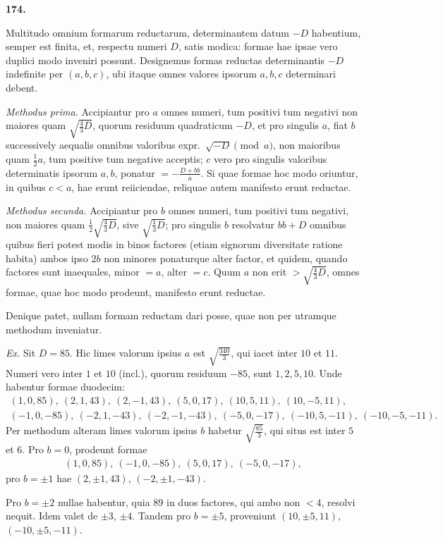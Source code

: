 \documentclass[12pt,a4paper]{article}
\theoremstyle{plain}
\theoremstyle{definition}
\theoremstyle{remark}
\begin{document}
\textbf{174.}

Multitudo omnium formarum reductarum, determinantem datum $-D$ habentium, semper est finita, et, respectu numeri $D$, satis modica: formae hae ipsae vero duplici modo inveniri possunt. Designemus formas reductas determinantis $-D$ indefinite per $(a,b,c)$, ubi itaque omnes valores ipsorum $a,b,c$ determinari debent.

\textit{Methodus prima.} Accipiantur pro $a$ omnes numeri, tum positivi tum negativi non maiores quam $\sqrt{\frac{4}{3}D}$, quorum residuum quadraticum $-D$, et pro singulis $a$, fiat $b$ successively aequalis omnibus valoribus expr.\ $\sqrt{-D}\pmod{a}$, non maioribus quam $\frac{1}{2}a$, tum positive tum negative acceptis; $c$ vero pro singulis valoribus determinatis ipsorum $a,b$, ponatur $=-\frac{D+bb}{a}$. Si quae formae hoc modo oriuntur, in quibus $c<a$, hae erunt reiiciendae, reliquae autem manifesto erunt reductae.

\textit{Methodus secunda.} Accipiantur pro $b$ omnes numeri, tum positivi tum negativi, non maiores quam $\frac{1}{2}\sqrt{\frac{4}{3}D}$, sive $\sqrt{\frac{1}{3}D}$; pro singulis $b$ resolvatur $bb+D$ omnibus quibus fieri potest modis in binos factores (etiam signorum diversitate ratione habita) ambos ipso $2b$ non minores ponaturque alter factor, et quidem, quando factores sunt inaequales, minor $=a$, alter $=c$. Quum $a$ non erit $>\sqrt{\frac{4}{3}D}$, omnes formae, quae hoc modo prodeunt, manifesto erunt reductae.

Denique patet, nullam formam reductam dari posse, quae non per utramque methodum inveniatur.

\textit{Ex.} Sit $D=85$. Hic limes valorum ipsius $a$ est $\sqrt{\frac{340}{3}}$, qui iacet inter $10$ et $11$. Numeri vero inter $1$ et $10$ (incl.), quorum residuum $-85$, sunt $1,2,5,10$. Unde habentur formae duodecim:
\begin{gather*}
(1,0,85),\ (2,1,43),\ (2,-1,43),\ (5,0,17),\ (10,5,11),\ (10,-5,11),\\
(-1,0,-85),\ (-2,1,-43),\ (-2,-1,-43),\ (-5,0,-17),\ (-10,5,-11),\ (-10,-5,-11).
\end{gather*}
Per methodum alteram limes valorum ipsius $b$ habetur $\sqrt{\frac{85}{3}}$, qui situs est inter $5$ et $6$. Pro $b=0$, prodeunt formae
\begin{gather*}
(1,0,85),\ (-1,0,-85),\ (5,0,17),\ (-5,0,-17),\end{gather*}
pro $b=\pm 1$ hae $(2,\pm 1,43)$, $(-2,\pm 1,-43)$.

Pro $b=\pm 2$ nullae habentur, quia $89$ in duos factores, qui ambo non $<4$, resolvi nequit. Idem valet de $\pm 3$, $\pm 4$. Tandem pro $b=\pm 5$, proveniunt $(10,\pm 5,11)$, $(-10,\pm 5,-11)$.
\end{document}
